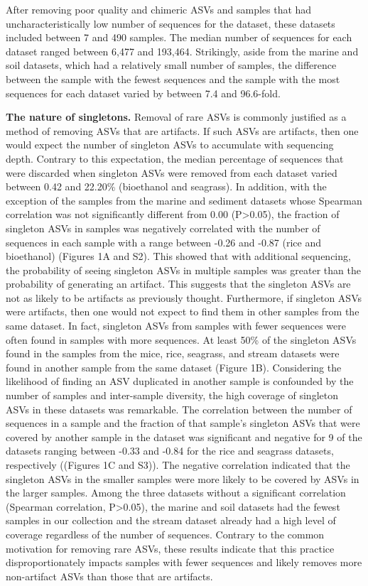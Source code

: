 \documentclass[
]{article}
\begin{document}
After removing poor quality and chimeric ASVs and samples that had
uncharacteristically low number of sequences for the dataset, these
datasets included between 7 and 490 samples. The median number of
sequences for each dataset ranged between 6,477 and 193,464. Strikingly,
aside from the marine and soil datasets, which had a relatively small
number of samples, the difference between the sample with the fewest
sequences and the sample with the most sequences for each dataset varied
by between 7.4 and 96.6-fold.

\textbf{The nature of singletons.} Removal of rare ASVs is commonly
justified as a method of removing ASVs that are artifacts. If such ASVs
are artifacts, then one would expect the number of singleton ASVs to
accumulate with sequencing depth. Contrary to this expectation, the
median percentage of sequences that were discarded when singleton ASVs
were removed from each dataset varied between 0.42 and 22.20\%
(bioethanol and seagrass). In addition, with the exception of the
samples from the marine and sediment datasets whose Spearman correlation
was not significantly different from 0.00 (P\textgreater0.05), the
fraction of singleton ASVs in samples was negatively correlated with the
number of sequences in each sample with a range between -0.26 and -0.87
(rice and bioethanol) (Figures 1A and S2). This showed that with
additional sequencing, the probability of seeing singleton ASVs in
multiple samples was greater than the probability of generating an
artifact. This suggests that the singleton ASVs are not as likely to be
artifacts as previously thought. Furthermore, if singleton ASVs were
artifacts, then one would not expect to find them in other samples from
the same dataset. In fact, singleton ASVs from samples with fewer
sequences were often found in samples with more sequences. At least 50\%
of the singleton ASVs found in the samples from the mice, rice,
seagrass, and stream datasets were found in another sample from the same
dataset (Figure 1B). Considering the likelihood of finding an ASV
duplicated in another sample is confounded by the number of samples and
inter-sample diversity, the high coverage of singleton ASVs in these
datasets was remarkable. The correlation between the number of sequences
in a sample and the fraction of that sample's singleton ASVs that were
covered by another sample in the dataset was significant and negative
for 9 of the datasets ranging between -0.33 and -0.84 for the rice and
seagrass datasets, respectively ((Figures 1C and S3)). The negative
correlation indicated that the singleton ASVs in the smaller samples
were more likely to be covered by ASVs in the larger samples. Among the
three datasets without a significant correlation (Spearman correlation,
P\textgreater0.05), the marine and soil datasets had the fewest samples
in our collection and the stream dataset already had a high level of
coverage regardless of the number of sequences. Contrary to the common
motivation for removing rare ASVs, these results indicate that this
practice disproportionately impacts samples with fewer sequences and
likely removes more non-artifact ASVs than those that are artifacts.
\end{document}
